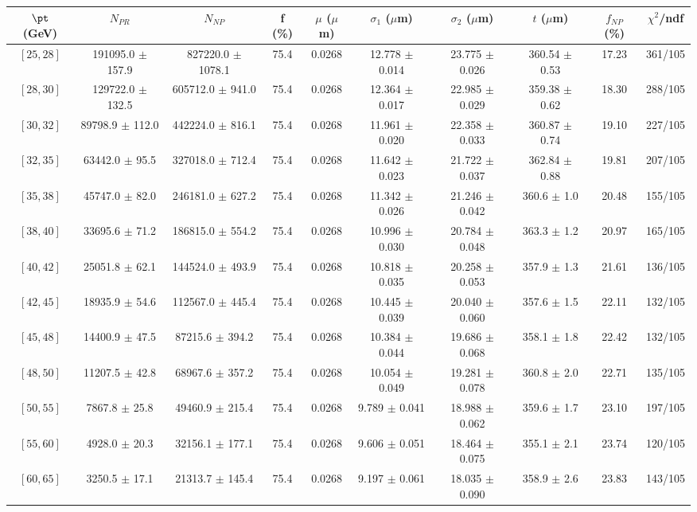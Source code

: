\begin{tabular}{c||c|c|c|c|c|c|c||c|c}
$\pt$ (GeV) & $N_{PR}$ & $N_{NP}$ & f (\%) & $\mu$ ($\mu$m) & $\sigma_1$ ($\mu$m) & $\sigma_2$ ($\mu$m)  & $t$ ($\mu$m) & $f_{NP}$ (\%) & $\chi^2$/ndf \\
\hline
$[25, 28]$ & 191095.0 $\pm$ 157.9 & 827220.0 $\pm$ 1078.1 & 75.4 & 0.0268 & 12.778 $\pm$ 0.014 & 23.775 $\pm$ 0.026 & 360.54 $\pm$ 0.53 & 17.23 & 361/105\\
$[28, 30]$ & 129722.0 $\pm$ 132.5 & 605712.0 $\pm$ 941.0 & 75.4 & 0.0268 & 12.364 $\pm$ 0.017 & 22.985 $\pm$ 0.029 & 359.38 $\pm$ 0.62 & 18.30 & 288/105\\
$[30, 32]$ & 89798.9 $\pm$ 112.0 & 442224.0 $\pm$ 816.1 & 75.4 & 0.0268 & 11.961 $\pm$ 0.020 & 22.358 $\pm$ 0.033 & 360.87 $\pm$ 0.74 & 19.10 & 227/105\\
$[32, 35]$ & 63442.0 $\pm$ 95.5 & 327018.0 $\pm$ 712.4 & 75.4 & 0.0268 & 11.642 $\pm$ 0.023 & 21.722 $\pm$ 0.037 & 362.84 $\pm$ 0.88 & 19.81 & 207/105\\
$[35, 38]$ & 45747.0 $\pm$ 82.0 & 246181.0 $\pm$ 627.2 & 75.4 & 0.0268 & 11.342 $\pm$ 0.026 & 21.246 $\pm$ 0.042 & 360.6 $\pm$ 1.0 & 20.48 & 155/105\\
$[38, 40]$ & 33695.6 $\pm$ 71.2 & 186815.0 $\pm$ 554.2 & 75.4 & 0.0268 & 10.996 $\pm$ 0.030 & 20.784 $\pm$ 0.048 & 363.3 $\pm$ 1.2 & 20.97 & 165/105\\
$[40, 42]$ & 25051.8 $\pm$ 62.1 & 144524.0 $\pm$ 493.9 & 75.4 & 0.0268 & 10.818 $\pm$ 0.035 & 20.258 $\pm$ 0.053 & 357.9 $\pm$ 1.3 & 21.61 & 136/105\\
$[42, 45]$ & 18935.9 $\pm$ 54.6 & 112567.0 $\pm$ 445.4 & 75.4 & 0.0268 & 10.445 $\pm$ 0.039 & 20.040 $\pm$ 0.060 & 357.6 $\pm$ 1.5 & 22.11 & 132/105\\
$[45, 48]$ & 14400.9 $\pm$ 47.5 & 87215.6 $\pm$ 394.2 & 75.4 & 0.0268 & 10.384 $\pm$ 0.044 & 19.686 $\pm$ 0.068 & 358.1 $\pm$ 1.8 & 22.42 & 132/105\\
$[48, 50]$ & 11207.5 $\pm$ 42.8 & 68967.6 $\pm$ 357.2 & 75.4 & 0.0268 & 10.054 $\pm$ 0.049 & 19.281 $\pm$ 0.078 & 360.8 $\pm$ 2.0 & 22.71 & 135/105\\
$[50, 55]$ & 7867.8 $\pm$ 25.8 & 49460.9 $\pm$ 215.4 & 75.4 & 0.0268 & 9.789 $\pm$ 0.041 & 18.988 $\pm$ 0.062 & 359.6 $\pm$ 1.7 & 23.10 & 197/105\\
$[55, 60]$ & 4928.0 $\pm$ 20.3 & 32156.1 $\pm$ 177.1 & 75.4 & 0.0268 & 9.606 $\pm$ 0.051 & 18.464 $\pm$ 0.075 & 355.1 $\pm$ 2.1 & 23.74 & 120/105\\
$[60, 65]$ & 3250.5 $\pm$ 17.1 & 21313.7 $\pm$ 145.4 & 75.4 & 0.0268 & 9.197 $\pm$ 0.061 & 18.035 $\pm$ 0.090 & 358.9 $\pm$ 2.6 & 23.83 & 143/105\\

\end{tabular}
